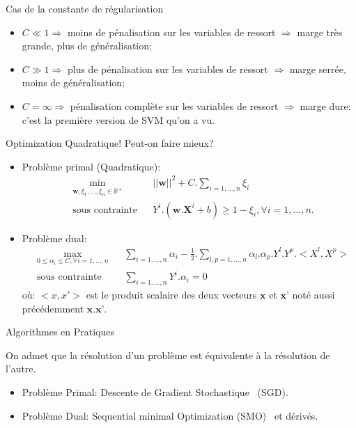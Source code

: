 \documentclass[8pt]{beamer}
\begin{document}
		\begin{frame}{Cas de la constante de régularisation}
			\begin{itemize}
				\item<1->  $C \ll 1 \Longrightarrow$ moins de pénalisation sur les variables de ressort $\Longrightarrow$ marge très grande, plus de généralisation;
				\item<2->  $C \gg 1 \Longrightarrow$ plus de pénalisation sur les variables de ressort $\Longrightarrow$ marge serrée, moins de généralisation;
				\item<3->  $C=\infty \Longrightarrow$ pénalisation complète sur les variables de ressort $\Longrightarrow$ marge dure: c'est la première version de SVM qu'on a vu.
			\end{itemize}
		\end{frame}
		\begin{frame}{Optimization Quadratique! Peut-on faire mieux?}
			\begin{itemize}
				\item<1->  Problème primal (Quadratique):
				\begin{equation}
					\begin{aligned}
					& \min_{\textbf{w}, \xi_1,\dots,\xi_n \in \mathbb{R}^+}
					& & {\vert\vert \textbf{w} \vert\vert}^2 + C.\sum_{i=1,\dots,n}\xi_i \\
					& \text{sous contrainte}
					& & Y^i.(\textbf{w}.\textbf{X}^i + b) \geq 1 - \xi_i , \forall i = 1, \dots, n.
					\end{aligned}
				\end{equation}
				\item<2->  Problème dual:
				\begin{equation}
					\begin{aligned}
					& \max_{0 \leq \alpha_i \leq C ,\forall i=1,\dots,n}
					& & \sum_{i=1,\dots,n} \alpha_i - \frac{1}{2}.\sum_{l,p=1,\dots,n}\alpha_l.\alpha_p.Y^l.Y^p.<X^l,X^p>\\
					& \text{sous contrainte}
					& & \sum_{i=1,\dots,n}Y^i.\alpha_i=0
					\end{aligned}
				\end{equation}
				où: $<x, x'>$ est le produit scalaire des deux vecteurs $\textbf{x}$ et $\textbf{x'}$ noté aussi précédemment $\textbf{x}.\textbf{x'}$.
			\end{itemize}
		\end{frame}
		\begin{frame}{Algorithmes en Pratiques}

			On admet que la résolution d'un problème est équivalente à la résolution de l'autre.
			\begin{itemize}
				\item  Problème Primal: Descente de Gradient Stochastique~\cite{bottou2010} (SGD).
				\item  Problème Dual: Sequential minimal Optimization (SMO)~\cite{platt1998sequential} et dérivés.
			\end{itemize}
		\end{frame}
\end{document}
